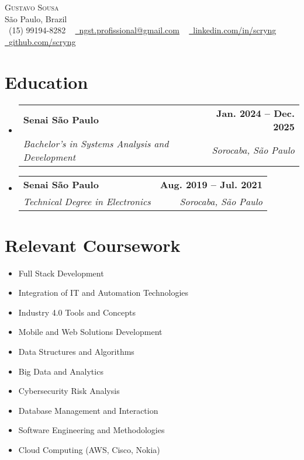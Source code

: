 \documentclass[letterpaper,11pt]{article}
\makeatletter
\newcommand{\resumeSubheading}[4]{
  \vspace{-2pt}\item
    \begin{tabular*}{1.0\textwidth}[t]{l@{\extracolsep{\fill}}r}
      \textbf{#1} & \textbf{\small #2} \\
      \textit{\small#3} & \textit{\small #4} \\
    \end{tabular*}\vspace{-7pt}
}
\newcommand{\resumeSubHeadingListStart}{\begin{itemize}[leftmargin=0.0in, label={}]}
\newcommand{\resumeSubHeadingListEnd}{\end{itemize}}
\makeatother
\begin{document}
\begin{center}
    {\Huge \scshape Gustavo Sousa} \\ \vspace{1pt}
    São Paulo, Brazil \\ \vspace{1pt}
    \small \raisebox{-0.1\height}\faPhone\ (15) 99194-8282 ~ 
    \href{mailto:gnyrcs@gmail.com}{\raisebox{-0.2\height}\faEnvelope\  \underline{ngst.profissional@gmail.com}} ~ 
    \href{https://linkedin.com/in/scryng}{\raisebox{-0.2\height}\faLinkedin\ \underline{linkedin.com/in/scryng}}  ~
    \href{https://github.com/scryng}{\raisebox{-0.2\height}\faGithub\ \underline{github.com/scryng}}
    \vspace{-8pt}
\end{center}

\section{Education}
  \resumeSubHeadingListStart
    \resumeSubheading
      {Senai São Paulo}{Jan. 2024 -- Dec. 2025}
      {Bachelor's in Systems Analysis and Development}{Sorocaba, São Paulo}
    \resumeSubheading
      {Senai São Paulo}{Aug. 2019 -- Jul. 2021}
      {Technical Degree in Electronics}{Sorocaba, São Paulo}
  \resumeSubHeadingListEnd

\section{Relevant Coursework}
    \begin{multicols}{2}
        \begin{itemize}[itemsep=-5pt, parsep=3pt]
            \item\small Full Stack Development
            \item Integration of IT and Automation Technologies
            \item Industry 4.0 Tools and Concepts
            \item Mobile and Web Solutions Development
            \item Data Structures and Algorithms
            \item Big Data and Analytics
            \item Cybersecurity Risk Analysis
            \item Database Management and Interaction
            \item Software Engineering and Methodologies
            \item Cloud Computing (AWS, Cisco, Nokia)
        \end{itemize}
    \end{multicols}
    \vspace*{2.0\multicolsep}
\end{document}
